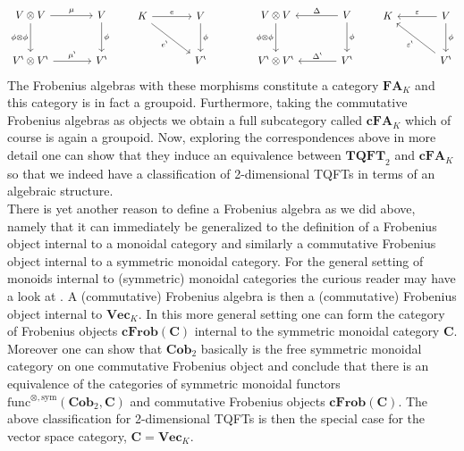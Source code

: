 \begin{equation*}
\begin{tikzcd}[row sep=2.7em,column sep=3.6em]
  V \otimes V
  \ar{r}{\mu}
  \ar{d}[swap]{\phi \otimes \phi}
  &
  V
  \ar{d}{\phi}
  \\
  V^{\backprime} \otimes V^{\backprime}
  \ar{r}{\mu^{\backprime}}
  &
  V^{\backprime}
\end{tikzcd}
\qquad
\begin{tikzcd}[row sep=2.7em,column sep=3.6em]
  K
  \ar{r}{e}
  \ar{rd}[swap]{e^{\backprime}}
  &
  V
  \ar{d}{\phi}
  \\
  &
  V^{\backprime}
\end{tikzcd}
\qquad
\qquad
\begin{tikzcd}[row sep=2.7em,column sep=3.6em]
  V \otimes V
  \ar{d}[swap]{\phi \otimes \phi}
  &
  V
  \ar{d}{\phi}
  \ar{l}[swap]{\Delta}
  \\
  V^{\backprime} \otimes V^{\backprime}
  &
  V^{\backprime}
  \ar{l}[swap]{\Delta^{\backprime}}
\end{tikzcd}
\qquad
\begin{tikzcd}[row sep=2.7em,column sep=3.6em]
  K
  &
  V
  \ar{d}{\phi}
  \ar{l}[swap]{\varepsilon}
  \\
  &
  V^{\backprime}
  \ar{ul}{\varepsilon^{\backprime}}
\end{tikzcd}
\end{equation*}
The Frobenius algebras with these morphisms constitute a category $\mathbf{FA}_{K}$ and this category is in fact a groupoid. Furthermore, taking the commutative Frobenius algebras as objects we obtain a full subcategory called $\mathbf{cFA}_{K}$ which of course is again a groupoid. Now, exploring the correspondences above in more detail one can show that they induce an equivalence between $\mathbf{TQFT}_{2}$ and $\mathbf{cFA}_{K}$ so that we indeed have a classification of 2-dimensional TQFTs in terms of an algebraic structure.
\\
There is yet another reason to define a Frobenius algebra as we did above, namely that it can immediately be generalized to the definition of a Frobenius object internal to a monoidal category and similarly a commutative Frobenius object internal to a symmetric monoidal category. For the general setting of monoids internal to (symmetric) monoidal categories the curious reader may have a look at \cite{00000001}. A (commutative) Frobenius algebra is then a (commutative) Frobenius object internal to $\mathbf{Vec}_{K}$. In this more general setting one can form the category of Frobenius objects $\mathbf{cFrob}(\mathbf{C})$ internal to the symmetric monoidal category $\mathbf{C}$. Moreover one can show that $\mathbf{Cob}_{2}$ basically is the free symmetric monoidal category on one commutative Frobenius object and conclude that there is an equivalence of the categories of symmetric monoidal functors $\mathrm{func}^{\otimes,\mathrm{sym}}(\mathbf{Cob}_{2},\mathbf{C})$ and commutative Frobenius objects $\mathbf{cFrob}(\mathbf{C})$. The above classification for 2-dimensional TQFTs is then the special case for the vector space category, $\mathbf{C} = \mathbf{Vec}_{K}$.
